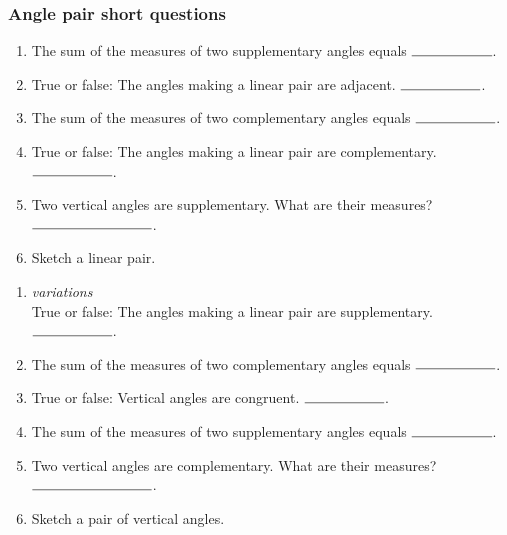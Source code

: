 \documentclass[12pt, twoside]{article}
\begin{document}
\subsubsection*{Angle pair short questions}
  \begin{enumerate}
    \item The sum of the measures of two supplementary angles equals $\rule{2cm}{0.15mm}$. \bigskip
    \item True or false: The angles making a linear pair are adjacent. $\rule{2cm}{0.15mm}$. \bigskip
    \item The sum of the measures of two complementary angles equals $\rule{2cm}{0.15mm}$. \bigskip
    \item True or false: The angles making a linear pair are complementary. $\rule{2cm}{0.15mm}$. \bigskip
    \item Two vertical angles are supplementary. What are their measures? $\rule{3cm}{0.15mm}$. \bigskip
    \item Sketch a linear pair.
    \end{enumerate}

  \begin{enumerate}
    \item \emph{variations}\\ True or false: The angles making a linear pair are supplementary. $\rule{2cm}{0.15mm}$. \bigskip
    \item The sum of the measures of two complementary angles equals $\rule{2cm}{0.15mm}$. \bigskip
    \item True or false: Vertical angles are congruent. $\rule{2cm}{0.15mm}$. \bigskip
    \item The sum of the measures of two supplementary angles equals $\rule{2cm}{0.15mm}$. \bigskip
    \item Two vertical angles are complementary. What are their measures? $\rule{3cm}{0.15mm}$. \bigskip
    \item Sketch a pair of vertical angles. \vspace{3cm}
    \end{enumerate}
\end{document}
